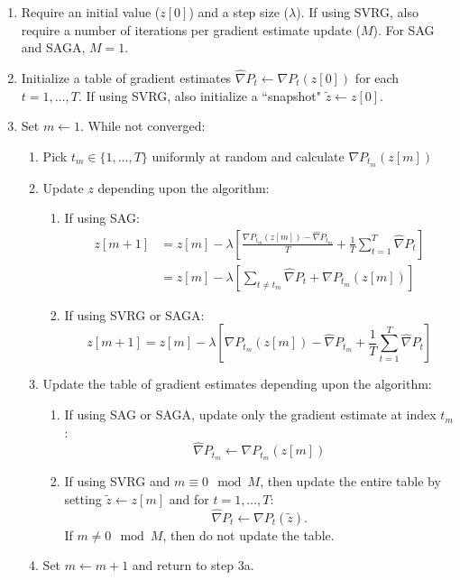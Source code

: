 \begin{enumerate}
    \item Require an initial value ($z[0]$) and a step size ($\lambda$). If using SVRG, also require a number of iterations per gradient estimate update ($M$). For SAG and SAGA, $M = 1$.
    \item Initialize a table of gradient estimates $\widehat \nabla P_t \leftarrow \nabla P_t (z[0])$ for each $t = 1,\ldots,T$. If using SVRG, also initialize a ``snapshot" $\tilde z \leftarrow z[0]$.
    \item Set $m \leftarrow 1$. While not converged:
    \begin{enumerate}
        \item Pick $t_m \in \{1,\ldots,T\}$ uniformly at random and calculate $\nabla P_{t_m}(z[m])$
        \item Update $z$ depending upon the algorithm:
        \begin{enumerate}
            \item If using SAG:
            \begin{align}
                z[m+1] &= z[m] - \lambda \left[\frac{\nabla P_{t_m}(z[m]) - \widehat \nabla P_{t_m}}{T} + \frac{1}{T} \sum_{t=1}^T \widehat \nabla P_{t} \right] \label{eqn:SAG_update} \\
                &= z[m] - \lambda \left[ \sum_{t \neq t_m} \widehat \nabla P_{t} + \nabla P_{t_m}(z[m]) \right] \nonumber
            \end{align}
            \item If using SVRG or SAGA:
            \begin{equation}
                z[m+1] = z[m] - \lambda \left[\nabla P_{t_m}(z[m]) - \widehat \nabla P_{t_m} + \frac{1}{T} \sum_{t=1}^T \widehat \nabla P_{t} \right]
                \label{eqn:SAGA_update}
            \end{equation}
        \end{enumerate}
        \item Update the table of gradient estimates depending upon the algorithm:
        \begin{enumerate}
            \item If using SAG or SAGA, update only the gradient estimate at index $t_m$:
            \begin{equation}
                \widehat \nabla P_{t_m} \leftarrow \nabla P_{t_m}(z[m])
            \end{equation}
            \item If using SVRG and $m \equiv 0 \mod M$, then update the entire table by setting $\tilde z \leftarrow z[m]$ and for $t = 1,\ldots,T$:
            \begin{equation}
                \widehat \nabla P_{t} \leftarrow \nabla P_{t}(\tilde z).
            \end{equation}
            If $m \neq 0 \mod M$, then do not update the table. 
        \end{enumerate}
        \item Set $m \leftarrow m+1$ and return to step 3a.
    \end{enumerate}
\end{enumerate}

